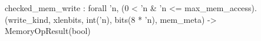 checked_mem_write : forall 'n, (0 < 'n & 'n <= max_mem_access).
  (write_kind, xlenbits, int('n), bits(8 * 'n), mem_meta) -> MemoryOpResult(bool)